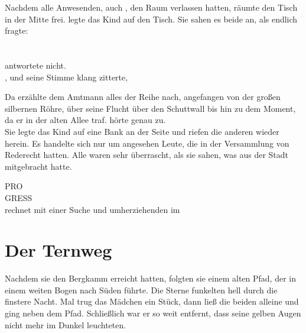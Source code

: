 \begin{huge}
Nachdem alle Anwesenden, auch {\Mena}, den Raum verlassen hatten, räumte {\Nox} den Tisch in der Mitte frei. {\Eno} legte das Kind auf den Tisch. Sie sahen es beide an, als {\Nox} endlich fragte: \\
\\
\\
{\Eno} antwortete nicht.\\
, und seine Stimme klang zitterte, 

Da erzählte {\Eno} dem Amtmann alles der Reihe nach, angefangen von der großen silbernen Röhre, über seine Flucht über den Schuttwall bis hin zu dem Moment, da er {\Bomar} in der alten Allee traf. {\Nox} hörte genau zu.
\\

Sie legte das Kind auf eine Bank an der Seite und riefen die anderen wieder herein. Es handelte sich nur um angesehen Leute, die in der Versammlung von {\Berna} Rederecht hatten. Alle waren sehr überrascht, als sie sahen, was {\Eno} aus der Stadt {\Tern} mitgebracht hatte.





PRO \\
GRESS \\

\Nox rechnet mit einer Suche und umherziehenden \Bangiri im 

\section{Der Ternweg}
Nachdem sie den Bergkamm erreicht hatten, folgten sie einem alten Pfad, der in einem weiten Bogen nach Süden führte. Die Sterne funkelten hell durch die finstere Nacht. Mal trug \Eno das Mädchen ein Stück, dann \Bomar  \Dolo ließ die beiden alleine und ging neben dem Pfad. Schließlich war er so weit entfernt, dass seine gelben Augen nicht mehr im Dunkel leuchteten.


\end{huge}
